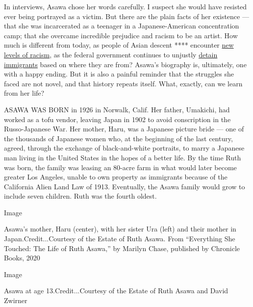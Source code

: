In interviews, Asawa chose her words carefully. I suspect she would have
resisted ever being portrayed as a victim. But there are the plain facts
of her existence --- that she was incarcerated as a teenager in a
Japanese-American concentration camp; that she overcame incredible
prejudice and racism to be an artist. How much is different from today,
as people of Asian descent **** encounter
\href{https://www.nytimes3xbfgragh.onion/2020/06/24/us/asian-american-racism-coronavirus-kelly-yang.html}{new
levels of racism}, as the federal government continues to unjustly
\href{https://www.nytimes3xbfgragh.onion/topic/subject/immigration-detention}{detain
immigrants} based on where they are from? Asawa's biography is,
ultimately, one with a happy ending. But it is also a painful reminder
that the struggles she faced are not novel, and that history repeats
itself. What, exactly, can we learn from her life?

ASAWA WAS BORN in 1926 in Norwalk, Calif. Her father, Umakichi, had
worked as a tofu vendor, leaving Japan in 1902 to avoid conscription in
the Russo-Japanese War. Her mother, Haru, was a Japanese picture bride
--- one of the thousands of Japanese women who, at the beginning of the
last century, agreed, through the exchange of black-and-white portraits,
to marry a Japanese man living in the United States in the hopes of a
better life. By the time Ruth was born, the family was leasing an
80-acre farm in what would later become greater Los Angeles, unable to
own property as immigrants because of the California Alien Land Law of
1913. Eventually, the Asawa family would grow to include seven children.
Ruth was the fourth oldest.

Image

Asawa's mother, Haru (center), with her sister Ura (left) and their
mother in Japan.Credit...Courtesy of the Estate of Ruth Asawa. From
``Everything She Touched: The Life of Ruth Asawa,'' by Marilyn Chase,
published by Chronicle Books, 2020

Image

Asawa at age 13.Credit...Courtesy of the Estate of Ruth Asawa and David
Zwirner

